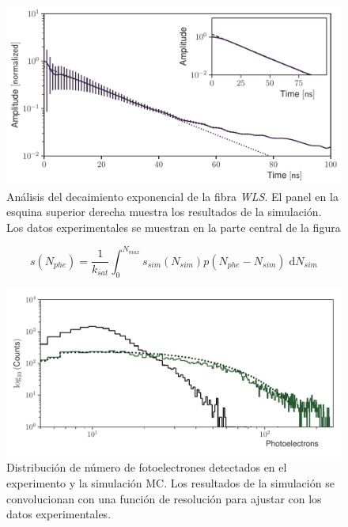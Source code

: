 \begin{figure}
        \centering
        \includegraphics[width=\textwidth]{muons-tail-fit.pdf}
        \caption{Análisis del decaimiento exponencial de la fibra \emph{WLS}. El panel en la esquina superior derecha muestra los resultados de la simulación. Los datos experimentales se muestran en la parte central de la figura}
        \label{fig:muons-tail}
\end{figure}

\begin{equation}
\label{equ:nphe}
s(N_{phe})=\frac{1}{k_{sat}}\int_{0}^{N_{max}} s_{sim}(N_{sim})p(N_{phe}-N_{sim})\;\mathrm{d}N_{sim}
\end{equation}

\begin{figure}
        \centering
        \includegraphics[width=\textwidth]{photons-number.pdf}
        \caption{Distribución de número de fotoelectrones detectados en el experimento y la simulación MC. Los resultados de la simulación se convolucionan con una función de resolución para ajustar con los datos experimentales.}
        \label{fig:photons-number}
\end{figure}
